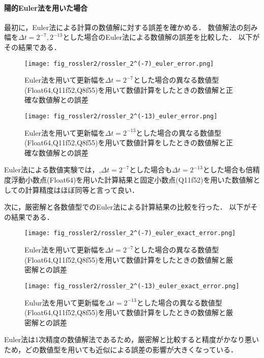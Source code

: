\paragraph*{陽的Euler法を用いた場合}
最初に，Euler法による計算の数値解に対する誤差を確かめる．
数値解法の刻み幅を$\Delta t = 2^{-7},2^{-13}$とした場合のEuler法による数値解の誤差を比較した．
以下がその結果である．
\begin{figure}[H]
    \centering
    \begin{minipage}[b]{0.49\columnwidth}
        \centering
        \texttt{[image: fig\_rossler2/rossler\_2^(-7)\_euler\_error.png]}
        \caption{Euler法を用いて更新幅を$\Delta t = 2^{-7}$とした場合の異なる数値型(Float64,Q11f52,Q8f55)を用いて数値計算をしたときの数値解と正確な数値解との誤差}
        \label{fig:rossler_2^(-7)_euler_error}
    \end{minipage}
    \begin{minipage}[b]{0.49\columnwidth}
        \centering
        \texttt{[image: fig\_rossler2/rossler\_2^(-13)\_euler\_error.png]}
        \caption{Euler法を用いて更新幅を$\Delta t =  2^{-13}$とした場合の異なる数値型(Float64,Q11f52,Q8f55)を用いて数値計算をしたときの数値解と正確な数値解との誤差}
        \label{fig:rossler_2^(-13)_euler_error}
    \end{minipage}
\end{figure} 
Euler法による数値実験では，,$\Delta t = 2^{-7}$とした場合も$\Delta t =  2^{-13}$とした場合も倍精度浮動小数点(Float64)を用いた計算結果と固定小数点(Q11f52)を用いた数値解としての計算精度はほぼ同等と言って良い．


次に，厳密解と各数値型でのEuler法による計算結果の比較を行った．
以下がその結果である．\\
\begin{figure}[H]
    \centering
    \begin{minipage}[b]{0.49\columnwidth}
        \centering
        \texttt{[image: fig\_rossler2/rossler\_2^(-7)\_euler\_exact\_error.png]}
        \caption{Euler法を用いて更新幅を$\Delta t = 2^{-7}$とした場合の異なる数値型(Float64,Q11f52,Q8f55)を用いて数値計算をしたときの数値解と厳密解との誤差}
        \label{fig:rossler_2^(-7)_eluer_exact_error}
    \end{minipage}
    \begin{minipage}[b]{0.49\columnwidth}
        \centering
        \texttt{[image: fig\_rossler2/rossler\_2^(-13)\_euler\_exact\_error.png]}
        \caption{Eulur法を用いて更新幅を$\Delta t =  2^{-13}$とした場合の異なる数値型(Float64,Q11f52,Q8f55)を用いて数値計算をしたときの数値解と厳密解との誤差}
        \label{fig:rossler_2^(-13)_euler_exact_error}
    \end{minipage}
\end{figure}
Euler法は1次精度の数値解法であるため，厳密解と比較すると精度がかなり悪いため，どの数値型を用いても近似による誤差の影響が大きくなっている．

